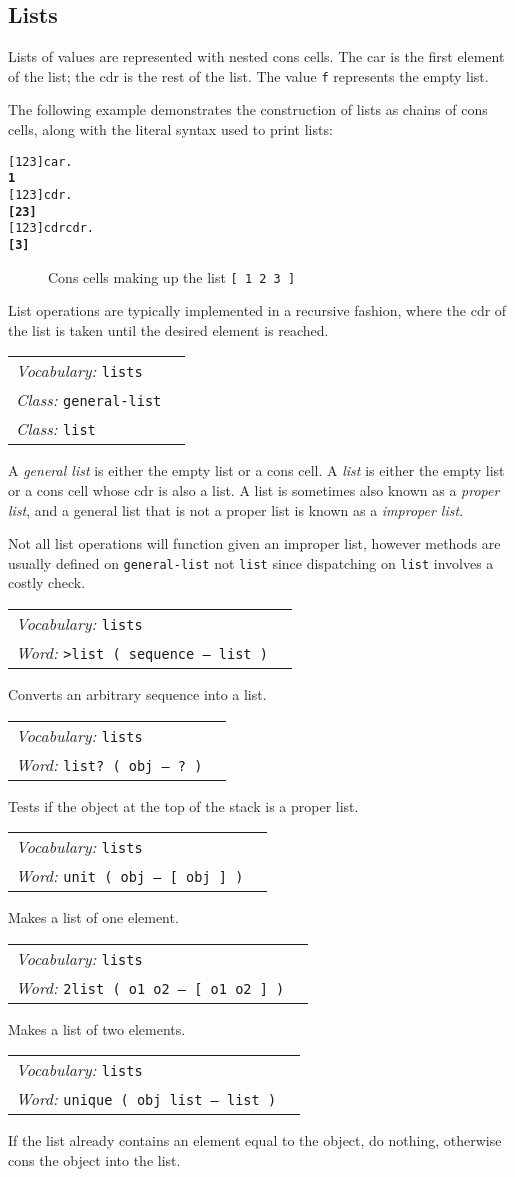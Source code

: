 \documentclass{book}
\newcommand{\vocabulary}[1]{\emph{Vocabulary:} \texttt{#1}&\\}
\newcommand{\ordinaryword}[2]{\index{\texttt{#1}}\emph{Word:} \texttt{#2}&\\}
\newcommand{\classword}[1]{\index{\texttt{#1}}\emph{Class:} \texttt{#1}&\\}
\newcommand{\wordtable}[1]{


\begin{tabularx}{12cm}{lX}
\hline
#1
\hline
\end{tabularx}

}
\begin{document}
\subsection{Lists}\label{lists}

\listglos
{}

Lists of values are represented with nested cons cells. The car is the first element of the list; the cdr is the rest of the list. The value \texttt{f} represents the empty list.

The following example demonstrates the construction of lists as chains of cons cells, along with the literal syntax used to print lists:
\begin{alltt}
  {[} 1 2 3 {]} car .
\textbf{1}
  {[} 1 2 3 {]} cdr .
\textbf{{[} 2 3 {]}}
  {[} 1 2 3 {]} cdr cdr .
\textbf{{[} 3 {]}}
\end{alltt}

\begin{figure}
\caption{Cons cells making up the list \texttt{[ 1 2 3 ]}}
\begin{center}
\end{center}
\end{figure}

List operations are typically implemented in a recursive fashion, where the cdr of the list is taken until the desired element is reached.

\wordtable{
\vocabulary{lists}
\classword{general-list}
\classword{list}
}
A \emph{general list} is either the empty list or a cons cell. A \emph{list} is either the empty list or a cons cell whose cdr is also a list. A list is sometimes also known as a \emph{proper list}, and a general list that is not a proper list is known as a \emph{improper list}.

Not all list operations will function given an improper list,
however methods are usually defined on \texttt{general-list} not \texttt{list} since dispatching on \texttt{list} involves a costly check.

\wordtable{
\vocabulary{lists}
\ordinaryword{>list}{>list ( sequence -- list )}
}
Converts an arbitrary sequence into a list.
\wordtable{
\vocabulary{lists}
\ordinaryword{list?}{list?~( obj -- ?~)}
}
Tests if the object at the top of the stack is a proper list.
\wordtable{
\vocabulary{lists}
\ordinaryword{unit}{unit ( obj -- [ obj ] )}
}
Makes a list of one element.
\wordtable{
\vocabulary{lists}
\ordinaryword{2list}{2list ( o1 o2 -- [ o1 o2 ] )}
}
Makes a list of two elements.
\wordtable{
\vocabulary{lists}
\ordinaryword{unique}{unique ( obj list -- list )}
}
If the list already contains an element equal to the object, do nothing, otherwise cons the object into the list.
\end{document}
